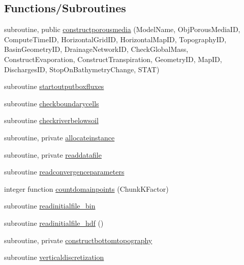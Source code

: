 \subsection*{Functions/\+Subroutines}
\begin{DoxyCompactItemize}
\item 
subroutine, public \mbox{\hyperlink{namespacemoduleporousmedia_ac5974f908fab2510640dceca6afdc55e}{constructporousmedia}} (Model\+Name, Obj\+Porous\+Media\+ID, Compute\+Time\+ID, Horizontal\+Grid\+ID, Horizontal\+Map\+ID, Topography\+ID, Basin\+Geometry\+ID, Drainage\+Network\+ID, Check\+Global\+Mass, Construct\+Evaporation, Construct\+Transpiration, Geometry\+ID, Map\+ID, Discharges\+ID, Stop\+On\+Bathymetry\+Change, S\+T\+AT)
\item 
subroutine \mbox{\hyperlink{namespacemoduleporousmedia_a964d0ccee02d1c5d84e0ea29ec30b3e7}{startoutputboxfluxes}}
\item 
subroutine \mbox{\hyperlink{namespacemoduleporousmedia_a2dddd8490c583823d5dd45c3bb20e816}{checkboundarycells}}
\item 
subroutine \mbox{\hyperlink{namespacemoduleporousmedia_a3f2cef78b695643e2f4662105678330c}{checkriverbelowsoil}}
\item 
subroutine, private \mbox{\hyperlink{namespacemoduleporousmedia_a52ed3f752ac2299db63f80ea0dca19d2}{allocateinstance}}
\item 
subroutine, private \mbox{\hyperlink{namespacemoduleporousmedia_a00f10b641a285b482aecd0a0d9289ed7}{readdatafile}}
\item 
subroutine \mbox{\hyperlink{namespacemoduleporousmedia_a8cce03cb321fdeb4b547654baa7cdf81}{readconvergenceparameters}}
\item 
integer function \mbox{\hyperlink{namespacemoduleporousmedia_a0fc4ab39d44c6c2942e125f98c3a3466}{countdomainpoints}} (Chunk\+K\+Factor)
\item 
subroutine \mbox{\hyperlink{namespacemoduleporousmedia_ad218337265b17e54150c2a4447473293}{readinitialfile\+\_\+bin}}
\item 
subroutine \mbox{\hyperlink{namespacemoduleporousmedia_ad6fc7e9521189f7f68bcd991a1724a96}{readinitialfile\+\_\+hdf}} ()
\item 
subroutine, private \mbox{\hyperlink{namespacemoduleporousmedia_a3f70a3e3d6c8c8f18b17f1417b314f3e}{constructbottomtopography}}
\item 
subroutine \mbox{\hyperlink{namespacemoduleporousmedia_ac906d07242e6b29b7b3f0b0984c50530}{verticaldiscretization}}
\item 

\end{DoxyCompactItemize}

